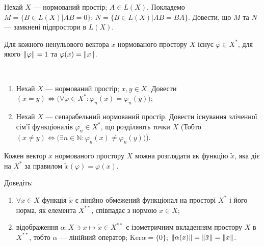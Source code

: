 \begin{exercise}
    Нехай $X$ --- нормований простір; $A \in L(X)$. Покладемо $M = \{B \in L(X) | AB=0\}$;
    $N = \{B \in L(X) | AB=BA\}$. Довести, що $M$ та $N$ --- замкнені підпростори в $L(X)$.
\end{exercise}

\begin{theory}
    \begin{theorem}
        Для кожного ненульового вектора $x$ нормованого простору $X$ існує $\varphi \in X^*$,
        для якого $\left\lVert\varphi\right\rVert = 1$ та $\varphi(x) = \left\lVert x\right\rVert$. 
    \end{theorem}
\end{theory}

\begin{exercise} ~
    \begin{enumerate}[label=\ukr*)]
        \item Нехай $X$ --- нормований простір; $x,y \in X$. Довести $(x=y) \Leftrightarrow 
        \big(\forall\varphi \in X^*: \varphi_n(x) = \varphi_n(y)\big)$;
        \item Нехай $X$ --- сепарабельний нормований простір. Довести існування зліченної сім'ї
        функціоналів $\varphi_n \in X^*$, що розділяють точки $X$ \Big(Тобто 
        $(x\neq y) \Leftrightarrow \big(\exists n \in \mathbb{N}: \varphi_n(x) \neq \varphi_n(y)\big)$\Big).
    \end{enumerate}
\end{exercise}

\begin{theory}
    Кожен вектор $x$ нормованого простору $X$ можна розглядати як функцію $\tilde{x}$, яка 
    діє на $X^*$ за правилом $\tilde{x}(\varphi)=\varphi(x)$.
\end{theory}

\begin{exercise}
    Доведіть:~
    \begin{enumerate}[label=\ukr*)]
        \item $\forall x \in X$ функція $\tilde{x}$ є лінійно обмежений функціонал на просторі $X^*$
        і його норма, як елемента $X^{**}$, співпадає з нормою $x \in X$;
        \item відображення $\alpha: X \ni x \mapsto \tilde{x} \in X^{**}$ є ізометричним вкладенням
        простору $X$ в $X^{**}$, тобто $\alpha$ --- лінійний оператор; $\mathrm{Ker}\alpha = \{0\}$; 
        $\left\lVert\alpha(x)\right\rVert = \left\lVert\tilde{x}\right\rVert = \left\lVert x\right\rVert$.
    \end{enumerate}
\end{exercise}

